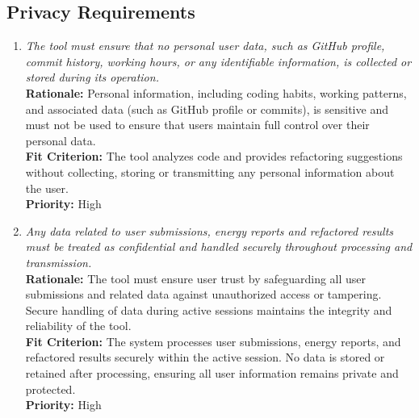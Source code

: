 \documentclass[12pt]{article}
\begin{document}
\subsection{Privacy Requirements}
\begin{enumerate}[label=SR-PR \arabic*., wide=0pt, leftmargin=*]
  \item \emph{The tool must ensure that no personal user data, such
      as GitHub profile, commit history, working hours, or any
      identifiable information, is collected or stored during its
    operation. }\\[2mm]
    {\bf Rationale:} Personal information, including coding habits,
    working patterns, and associated data (such as GitHub profile or
    commits), is sensitive and must not be used to ensure that users
    maintain full control over their personal data.\\
    {\bf Fit Criterion:} The tool analyzes code and provides
    refactoring suggestions without collecting, storing or
    transmitting any personal information about the user.\\
    {\bf Priority:} High
  \item \emph{Any data related to user submissions, energy reports
      and refactored results must be treated as confidential and
    handled securely throughout processing and transmission.}\\
    {\bf Rationale:} The tool must ensure user trust by safeguarding
    all user submissions and related data against unauthorized access
    or tampering. Secure handling of data during active sessions
    maintains the integrity and reliability of the tool. \\
    {\bf Fit Criterion:} The system processes user submissions,
    energy reports, and refactored results securely within the active
    session. No data is stored or retained after processing, ensuring
    all user information remains private and protected.\\
    {\bf Priority:} High
\end{enumerate}
\end{document}

